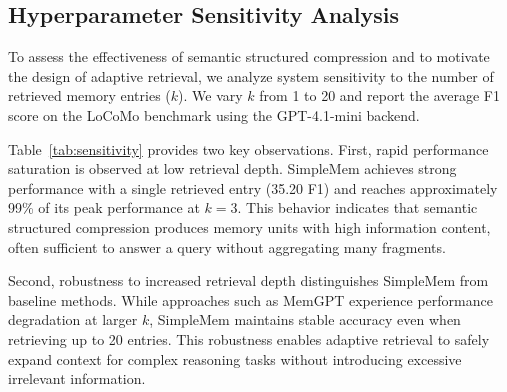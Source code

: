 \subsection{Hyperparameter Sensitivity Analysis}
\label{sec:sensitivity}

To assess the effectiveness of semantic structured compression and to motivate the design of adaptive retrieval, we analyze system sensitivity to the number of retrieved memory entries ($k$).
We vary $k$ from 1 to 20 and report the average F1 score on the LoCoMo benchmark using the GPT-4.1-mini backend.

\begin{table}
\footnotesize
\centering
\caption{Performance sensitivity to retrieval count ($k$). \textbf{SimpleMem} demonstrates "Rapid Saturation," reaching near-optimal performance at $k=3$ (42.85) compared to its peak at $k=10$ (43.45). This validates the high information density of Atomic Entries, proving that huge context windows are often unnecessary for accuracy.}
\label{tab:sensitivity}
\end{table}
Table~\ref{tab:sensitivity} provides two key observations. First, rapid performance saturation is observed at low retrieval depth.
SimpleMem achieves strong performance with a single retrieved entry (35.20 F1) and reaches approximately 99\% of its peak performance at $k=3$.
This behavior indicates that semantic structured compression produces memory units with high information content, often sufficient to answer a query without aggregating many fragments.

Second, robustness to increased retrieval depth distinguishes SimpleMem from baseline methods.
While approaches such as MemGPT experience performance degradation at larger $k$, SimpleMem maintains stable accuracy even when retrieving up to 20 entries.
This robustness enables adaptive retrieval to safely expand context for complex reasoning tasks without introducing excessive irrelevant information.


